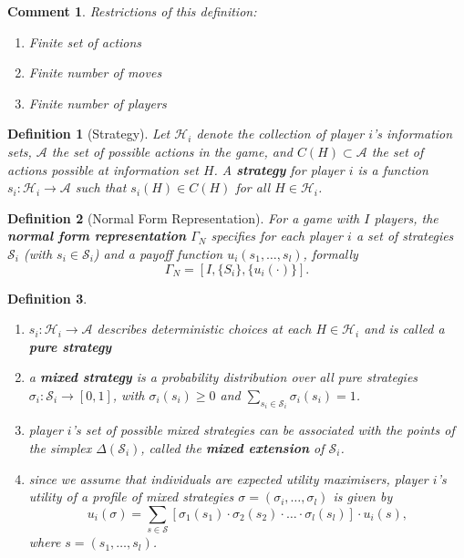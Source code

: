 \documentclass[12pt]{extreport} %
\theoremstyle{named}
\theoremstyle{itshape}
\newtheorem*{definition}{Definition}
\theoremstyle{normal}
\newtheorem*{comment*}{Comment}
\begin{document}
\begin{comment*}
	Restrictions of this definition:
	\begin{enumerate}
		\item Finite set of actions
		\item Finite number of moves
		\item Finite number 	of players
	\end{enumerate}
\end{comment*}

\begin{definition}[Strategy]
	Let $\mathcal{H}_i$ denote the collection of player $i$'s information sets, $\mathcal{A}$ the set of possible actions in the game, and $C(H) \subset \mathcal{A}$ the set of actions possible at information set $H$. A \textbf{strategy} for player $i$ is a function $s_i \colon \mathcal{H}_i \rightarrow \mathcal{A}$ such that $s_i(H) \in C(H)$ for all $H \in \mathcal{H}_i$.
\end{definition}

\begin{definition}[Normal Form Representation]
	For a game with $I$ players, the \textbf{normal form representation} $\Gamma_N$ specifies for each player $i$ a set of strategies $\mathcal{S}_{i}$ (with $s_i \in \mathcal{S}_i$) and a payoff function $u_i(s_1, \dotsc, s_l)$, formally 
	$$ \Gamma_N = [I, \{ S_i \}, \{ u_i(\cdot) \}]. $$
\end{definition} 

\newpage

\begin{definition} ~\
	\begin{enumerate}
		\item $s_i \colon \mathcal{H}_i \rightarrow \mathcal{A}$ describes deterministic choices at each $H \in \mathcal{H}_i$ and is called a \textbf{pure strategy}
		\item a \textbf{mixed strategy} is a probability distribution over all pure strategies $\sigma_i \colon \mathcal{S}_i \rightarrow [0, 1]$, with $\sigma_i(s_i) \geq 0$ and $\sum_{s_i \in \mathcal{S}_i} \sigma_i(s_i) = 1$.
		\item player $i$'s set of possible mixed strategies can be associated with the points of the simplex $\Delta(\mathcal{S}_i)$, called the \textbf{mixed extension} of $\mathcal{S}_i$.
		\item since we assume that individuals are expected utility maximisers, player $i$'s utility of a profile of mixed strategies $\sigma = \left( \sigma_i, \dotsc, \sigma_l \right)$ is given by
			$$ u_i(\sigma) = \sum_{s \in \mathcal{S}} [\sigma_1(s_1) \cdot \sigma_2(s_2) \cdot \dotsc \cdot \sigma_l(s_l)] \cdot u_i(s), $$
			where $s = (s_1, \dotsc, s_l)$.
	\end{enumerate}
\end{definition}
\end{document}
